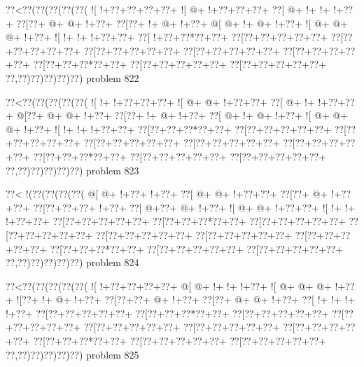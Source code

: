 \vbox{\vbox{\goo
\0??<\0??(\0??(\0??(\0??(\0??(
\- ![\- !+\0??+\0??+\0??+\0??+
\- ![\- @+\- !+\0??+\0??+\0??+
\0??[\- @+\- !+\- !+\- !+\0??+
\0??[\0??+\- @+\- @+\- !+\0??+
\0??[\0??+\- !+\- @+\- !+\0??+
\- @[\- @+\- !+\- @+\- !+\0??+
\- ![\- @+\- @+\- @+\- !+\0??+
\- ![\- !+\- !+\- !+\0??+\0??+
\0??[\- !+\0??+\0??*\0??+\0??+
\0??[\0??+\0??+\0??+\0??+\0??+
\0??[\0??+\0??+\0??+\0??+\0??+
\0??[\0??+\0??+\0??+\0??+\0??+
\0??[\0??+\0??+\0??+\0??+\0??+
\0??[\0??+\0??+\0??+\0??+\0??+
\0??[\0??+\0??+\0??*\0??+\0??+
\0??[\0??+\0??+\0??+\0??+\0??+
\0??[\0??+\0??+\0??+\0??+\0??+
\0??,\0??)\0??)\0??)\0??)\0??)
}
\hfil problem 822\hfil\break
}

\vbox{\vbox{\goo
\0??<\0??(\0??(\0??(\0??(\0??(
\- ![\- !+\- !+\0??+\0??+\0??+
\- ![\- @+\- @+\- !+\0??+\0??+
\0??[\- @+\- !+\- !+\0??+\0??+
\- @[\0??+\- @+\- @+\- !+\0??+
\0??[\0??+\- !+\- @+\- !+\0??+
\0??[\- @+\- !+\- @+\- !+\0??+
\- ![\- @+\- @+\- @+\- !+\0??+
\- ![\- !+\- !+\- !+\0??+\0??+
\0??[\0??+\0??+\0??*\0??+\0??+
\0??[\0??+\0??+\0??+\0??+\0??+
\0??[\0??+\0??+\0??+\0??+\0??+
\0??[\0??+\0??+\0??+\0??+\0??+
\0??[\0??+\0??+\0??+\0??+\0??+
\0??[\0??+\0??+\0??+\0??+\0??+
\0??[\0??+\0??+\0??*\0??+\0??+
\0??[\0??+\0??+\0??+\0??+\0??+
\0??[\0??+\0??+\0??+\0??+\0??+
\0??,\0??)\0??)\0??)\0??)\0??)
}
\hfil problem 823\hfil\break
}

\vbox{\vbox{\goo
\0??<\- !(\0??(\0??(\0??(\0??(
\- @[\- @+\- !+\0??+\- !+\0??+
\0??[\- @+\- @+\- !+\0??+\0??+
\0??[\0??+\- @+\- !+\0??+\0??+
\0??[\0??+\0??+\0??+\- !+\0??+
\0??[\- @+\0??+\- @+\- !+\0??+
\- ![\- @+\- @+\- !+\0??+\0??+
\- ![\- !+\- !+\- !+\0??+\0??+
\0??[\0??+\0??+\0??+\0??+\0??+
\0??[\0??+\0??+\0??*\0??+\0??+
\0??[\0??+\0??+\0??+\0??+\0??+
\0??[\0??+\0??+\0??+\0??+\0??+
\0??[\0??+\0??+\0??+\0??+\0??+
\0??[\0??+\0??+\0??+\0??+\0??+
\0??[\0??+\0??+\0??+\0??+\0??+
\0??[\0??+\0??+\0??*\0??+\0??+
\0??[\0??+\0??+\0??+\0??+\0??+
\0??[\0??+\0??+\0??+\0??+\0??+
\0??,\0??)\0??)\0??)\0??)\0??)
}
\hfil problem 824\hfil\break
}

\vbox{\vbox{\goo
\0??<\0??(\0??(\0??(\0??(\0??(
\- ![\- !+\0??+\0??+\0??+\0??+
\- @[\- @+\- !+\- !+\- !+\0??+
\- ![\- @+\- @+\- @+\- !+\0??+
\- ![\0??+\- !+\- @+\- !+\0??+
\0??[\0??+\0??+\- @+\- !+\0??+
\0??[\0??+\- @+\- @+\- !+\0??+
\0??[\- !+\- !+\- !+\- !+\0??+
\0??[\0??+\0??+\0??+\0??+\0??+
\0??[\0??+\0??+\0??*\0??+\0??+
\0??[\0??+\0??+\0??+\0??+\0??+
\0??[\0??+\0??+\0??+\0??+\0??+
\0??[\0??+\0??+\0??+\0??+\0??+
\0??[\0??+\0??+\0??+\0??+\0??+
\0??[\0??+\0??+\0??+\0??+\0??+
\0??[\0??+\0??+\0??*\0??+\0??+
\0??[\0??+\0??+\0??+\0??+\0??+
\0??[\0??+\0??+\0??+\0??+\0??+
\0??,\0??)\0??)\0??)\0??)\0??)
}
\hfil problem 825\hfil\break
}

